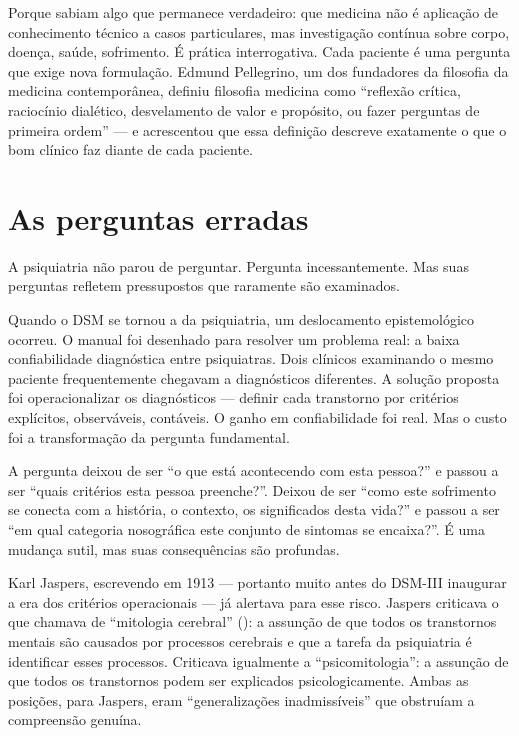 Porque sabiam algo que permanece verdadeiro: que medicina não é aplicação de conhecimento técnico a casos particulares, mas investigação contínua sobre corpo, doença, saúde, sofrimento. É prática interrogativa. Cada paciente é uma pergunta que exige nova formulação. Edmund Pellegrino, um dos fundadores da filosofia da medicina contemporânea, definiu filosofia  medicina como \enquote{reflexão crítica, raciocínio dialético, desvelamento de valor e propósito, ou fazer perguntas de primeira ordem} --- e acrescentou que essa definição descreve exatamente o que o bom clínico faz diante de cada paciente.

\section{As perguntas erradas}
\label{sec:perguntas-erradas}

A psiquiatria não parou de perguntar. Pergunta incessantemente. Mas suas perguntas refletem pressupostos que raramente são examinados.

Quando o DSM se tornou a  da psiquiatria, um deslocamento epistemológico ocorreu. O manual foi desenhado para resolver um problema real: a baixa confiabilidade diagnóstica entre psiquiatras. Dois clínicos examinando o mesmo paciente frequentemente chegavam a diagnósticos diferentes. A solução proposta foi operacionalizar os diagnósticos --- definir cada transtorno por critérios explícitos, observáveis, contáveis. O ganho em confiabilidade foi real. Mas o custo foi a transformação da pergunta fundamental.

A pergunta deixou de ser \enquote{o que está acontecendo com esta pessoa?} e passou a ser \enquote{quais critérios esta pessoa preenche?}. Deixou de ser \enquote{como este sofrimento se conecta com a história, o contexto, os significados desta vida?} e passou a ser \enquote{em qual categoria nosográfica este conjunto de sintomas se encaixa?}. É uma mudança sutil, mas suas consequências são profundas.

Karl Jaspers, escrevendo em 1913 --- portanto muito antes do DSM-III inaugurar a era dos critérios operacionais --- já alertava para esse risco. Jaspers criticava o que chamava de \enquote{mitologia cerebral} (): a assunção de que todos os transtornos mentais são causados por processos cerebrais e que a tarefa da psiquiatria é identificar esses processos. Criticava igualmente a \enquote{psicomitologia}: a assunção de que todos os transtornos podem ser explicados psicologicamente. Ambas as posições, para Jaspers, eram \enquote{generalizações inadmissíveis} que obstruíam a compreensão genuína.

